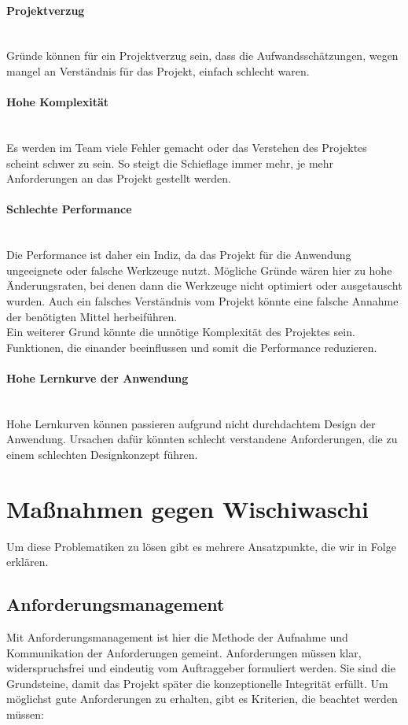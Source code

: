 \documentclass[a4paper, ngerman, 12pt, usenames, dvipsnames]{article}
\begin{document}
\paragraph{Projektverzug}\mbox{} \\
Gründe können für ein Projektverzug sein, dass die Aufwandsschätzungen, wegen mangel an Verständnis für das Projekt, einfach schlecht waren.
\paragraph{Hohe Komplexität}\mbox{} \\
Es werden im Team viele Fehler gemacht oder das Verstehen des Projektes scheint schwer zu sein. So steigt die Schieflage immer mehr, je mehr Anforderungen an das Projekt gestellt werden.
\paragraph{Schlechte Performance}\mbox{} \\
Die Performance ist daher ein Indiz, da das Projekt für die Anwendung ungeeignete oder falsche Werkzeuge nutzt. Mögliche Gründe wären hier zu hohe Änderungsraten, bei denen dann die Werkzeuge nicht optimiert oder ausgetauscht wurden. Auch ein falsches Verständnis vom Projekt könnte eine falsche Annahme der benötigten Mittel herbeiführen.\\
Ein weiterer Grund könnte die unnötige Komplexität des Projektes sein. Funktionen, die einander beeinflussen und somit die Performance reduzieren.
\paragraph{Hohe Lernkurve der Anwendung}\mbox{} \\
Hohe Lernkurven können passieren aufgrund nicht durchdachtem Design der Anwendung. Ursachen dafür könnten schlecht verstandene Anforderungen, die zu einem schlechten Designkonzept führen.

\section{Maßnahmen gegen Wischiwaschi}
Um diese Problematiken zu lösen gibt es mehrere Ansatzpunkte, die wir in Folge erklären.
\subsection{Anforderungsmanagement}
Mit Anforderungsmanagement ist hier die Methode der Aufnahme und Kommunikation der Anforderungen gemeint.
Anforderungen müssen klar, widerspruchsfrei und eindeutig vom Auftraggeber formuliert werden. Sie sind die Grundsteine, damit das Projekt später die konzeptionelle Integrität erfüllt. Um möglichst gute Anforderungen zu erhalten, gibt es Kriterien, die beachtet werden müssen:
\end{document}
